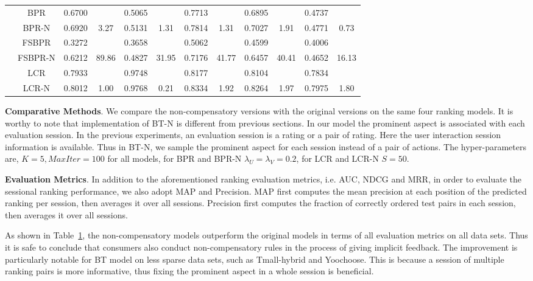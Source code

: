 \documentclass[letterpaper]{article} %
\begin{document}
\begin{table}[ht]
\begin{center}
\begin{tabular}{c|c |cc |cc |cc|cc|cc}
&BPR	&0.6700 	&	&0.5065 	&	&0.7713 	&	&0.6895 	&	&0.4737 & \\
&BPR-N	&0.6920 	&3.27	&0.5131 	&1.31	&0.7814 	&1.31	&0.7027 	&1.91	&0.4771&0.73 \\
&FSBPR	&0.3272 	&	&0.3658 	&	&0.5062 	&	&0.4599 	&	&0.4006 &\\
&FSBPR-N	&0.6212 	&89.86	&0.4827 	&31.95	&0.7176 	&41.77	&0.6457 	&40.41	&0.4652 &16.13\\
&LCR &0.7933& &0.9748 && 0.8177& &0.8104& & 0.7834 &\\ 
&LCR-N &0.8012 &1.00 & 0.9768 &0.21 &0.8334 &1.92 &0.8264 & 1.97 &0.7975  &1.80\\
	\hline
	\end{tabular}
\end{center}
\label{tab:gradedresult}
\end{table}%

\textbf{Comparative Methods}. We compare the non-compensatory versions with the original versions on the same four ranking models. It is worthy to note that implementation of BT-N is different from previous sections.  In our model the prominent aspect is associated with each evaluation session. In the previous experiments, an evaluation session is a rating or a pair of rating. Here the user interaction session information is available. Thus in BT-N, we sample the prominent aspect for each session instead of a pair of actions. The hyper-parameters are, $K=5, MaxIter=100$ for all models, for BPR and BPR-N $\lambda_U=\lambda_V=0.2$, for LCR and LCR-N $S=50$.  

\textbf{Evaluation Metrics}.  In addition to the aforementioned  ranking evaluation metrics, i.e. AUC, NDCG and MRR, in order to evaluate the sessional ranking performance, we also adopt  MAP and Precision. MAP first computes the mean precision at each position of the predicted ranking per session, then averages it over all sessions. Precision first computes the fraction of correctly ordered test pairs in each session, then averages it over all sessions. 

As shown in Table~\ref{tab:gradedresult}, the non-compensatory models outperform the original models in terms of all evaluation metrics on all data sets. Thus it is safe to conclude that consumers also conduct non-compensatory rules in the process of giving implicit feedback. The improvement is particularly notable for BT model on less sparse data sets, such as Tmall-hybrid and Yoochoose. This is because a session of multiple ranking pairs is more informative, thus fixing the prominent aspect in a whole session is beneficial.
\end{document}
